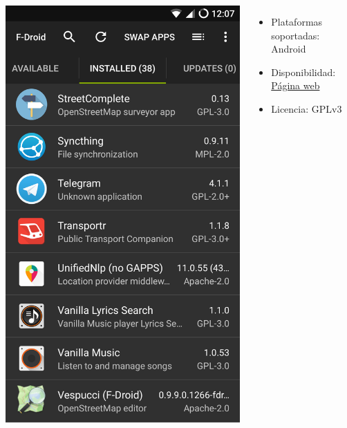 \begin{frame}
\begin{columns}[c]
\begin{center}
                \includegraphics[height=0.5\textheight]{images/fdroid-screencap.png}
            \end{center}
            \begin{itemize}
                \item Plataformas soportadas: Android
                \item Disponibilidad: \href{https://f-droid.org/es/}{Página web}
                \item Licencia: GPLv3
            \end{itemize}
    \end{columns}

\end{frame}

